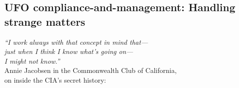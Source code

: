 %
%
%

\begin{partbacktext}
\part{UFO compliance-and-management: Handling strange matters}
\noindent

\begin{flushright}
{\em ``I work always with that concept  in mind that---\\
just when I think I know what's going   on---\\
I might not know.''}  \\
Annie Jacobsen in the Commonwealth Club of California,\\
on inside the CIA's secret history\cite[time=39:17]{Jacobsen2019May}:
\end{flushright}


\end{partbacktext}
